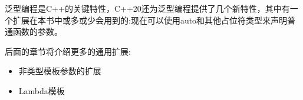 泛型编程是C++的关键特性，C++20还为泛型编程提供了几个新特性，其中有一个扩展在本书中或多或少会用到的:现在可以使用auto和其他占位符类型来声明普通函数的参数。

后面的章节将介绍更多的通用扩展:

\begin{itemize}
\item
非类型模板参数的扩展

\item
Lambda模板
\end{itemize}